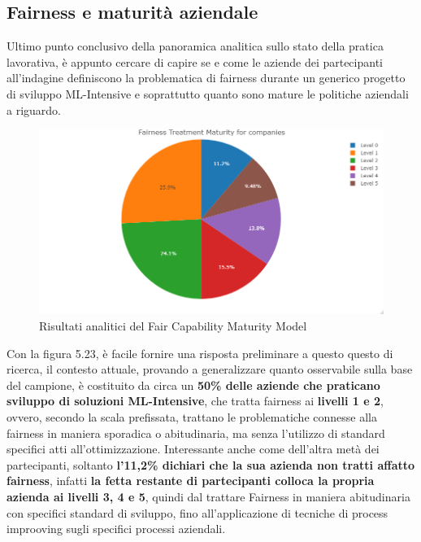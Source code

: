     \subsection{Fairness e maturità aziendale}
    
    \begin{center}
    	\hspace*{-5mm}%
    \end{center}
    
    Ultimo punto conclusivo della panoramica analitica sullo stato della pratica lavorativa, è appunto cercare di capire se e come le aziende dei partecipanti all'indagine definiscono la problematica di fairness durante un generico progetto di sviluppo ML-Intensive e soprattutto quanto sono mature le politiche aziendali a riguardo. 
    
    \begin{figure}[h!]
        \centering
        \includegraphics[width=1\textwidth]{figure/Analisi/RQ5/Fairness Treatment Maturity for companies.png}
        \caption{Risultati analitici del Fair Capability Maturity Model}
    \end{figure}
    
    Con la figura 5.23, è facile fornire una risposta preliminare a questo questo di ricerca, il contesto attuale, provando a generalizzare quanto osservabile sulla base del campione, è costituito da circa un \textbf{50\% delle aziende che praticano sviluppo di soluzioni ML-Intensive}, che tratta fairness ai \textbf{livelli 1 e 2}, ovvero, secondo la scala prefissata, trattano le problematiche connesse alla fairness in maniera sporadica o abitudinaria, ma senza l'utilizzo di standard specifici atti all'ottimizzazione. Interessante anche come dell'altra metà dei partecipanti, soltanto \textbf{l'11,2\% dichiari che la sua azienda non tratti affatto fairness}, infatti \textbf{la fetta restante di partecipanti colloca la propria azienda ai livelli 3, 4 e 5}, quindi dal trattare Fairness in maniera abitudinaria con specifici standard di sviluppo, fino all'applicazione di tecniche di process improoving sugli specifici processi aziendali. 
    
